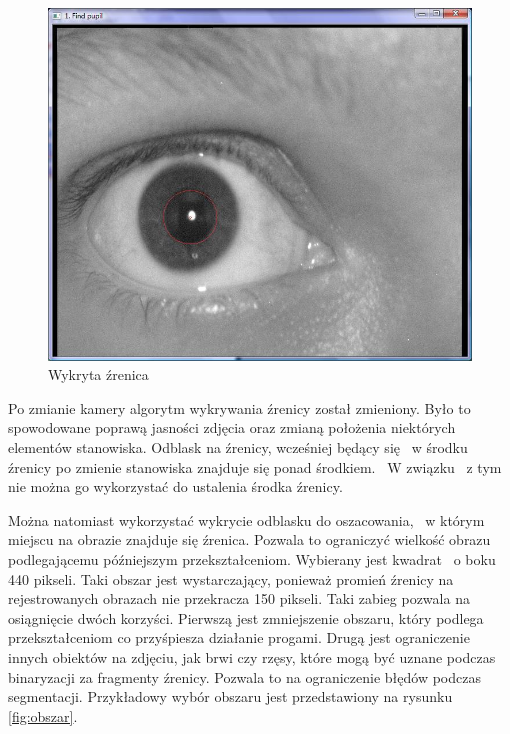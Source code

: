 \begin{figure}
\begin{center}
\includegraphics[scale=0.5]{zrenica.jpg}
\caption{Wykryta źrenica}
\label{fig:zrenicaNasza}
\end{center}
\end{figure}

Po zmianie kamery algorytm wykrywania źrenicy został zmieniony. Było to spowodowane poprawą jasności zdjęcia oraz zmianą położenia niektórych elementów stanowiska. Odblask na źrenicy, wcześniej będący się ~w środku źrenicy po zmienie stanowiska znajduje się ponad środkiem. ~W związku ~z tym nie można go wykorzystać do ustalenia środka źrenicy.

Można natomiast wykorzystać wykrycie odblasku do oszacowania, ~w którym miejscu na obrazie znajduje się źrenica. Pozwala to ograniczyć wielkość obrazu podlegającemu późniejszym przekształceniom. Wybierany jest kwadrat ~o boku 440 pikseli. Taki obszar jest wystarczający, ponieważ promień źrenicy na rejestrowanych obrazach nie przekracza 150 pikseli. Taki zabieg pozwala na osiągnięcie dwóch korzyści. Pierwszą jest zmniejszenie obszaru, który podlega przekształceniom co przyśpiesza działanie progami. Drugą jest ograniczenie innych obiektów na zdjęciu, jak brwi czy rzęsy, które mogą być uznane podczas binaryzacji za fragmenty źrenicy. Pozwala to na ograniczenie błędów podczas segmentacji. Przykładowy wybór obszaru jest przedstawiony na rysunku \ref{fig:obszar}.

